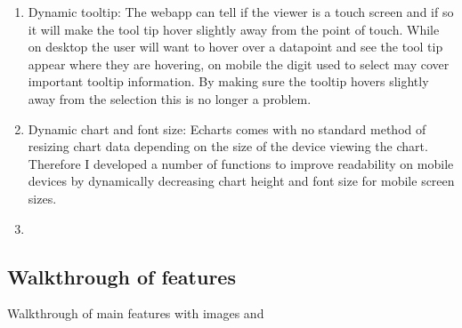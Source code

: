 \begin{enumerate}
    \item Dynamic tooltip: The webapp can tell if the viewer is a touch screen
          and if so it will make the tool tip hover slightly away from the point
          of touch. While on desktop the user will want to hover over a
          datapoint and see the tool tip appear where they are hovering, on
          mobile the digit used to select may cover important tooltip
          information. By making sure the tooltip hovers slightly away from the
          selection this is no longer a problem.
    \item Dynamic chart and font size: Echarts comes with no standard method of
          resizing chart data depending on the size of the device viewing the
          chart. Therefore I developed a number of functions to improve
          readability on mobile devices by dynamically decreasing chart height
          and font size for mobile screen sizes.
    \item
\end{enumerate}

\subsection{ Walkthrough of features}

Walkthrough of main features with images and 




